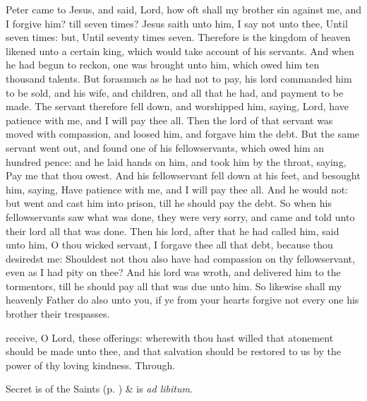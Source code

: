 
 Peter came to Jesus, and said, Lord, how oft shall my brother sin against me, and I forgive him? till seven times? Jesus saith unto him, I say not unto thee, Until seven times: but, Until seventy times seven. Therefore is the kingdom of heaven likened unto a certain king, which would take account of his servants. And when he had begun to reckon, one was brought unto him, which owed him ten thousand talents. But forasmuch as he had not to pay, his lord commanded him to be sold, and his wife, and children, and all that he had, and payment to be made. The servant therefore fell down, and worshipped him, saying, Lord, have patience with me, and I will pay thee all. Then the lord of that servant was moved with compassion, and loosed him, and forgave him the debt. But the same servant went out, and found one of his fellowservants, which owed him an hundred pence: and he laid hands on him, and took him by the throat, saying, Pay me that thou owest. And his fellowservant fell down at his feet, and besought him, saying, Have patience with me, and I will pay thee all. And he would not: but went and cast him into prison, till he should pay the debt. So when his fellowservants saw what was done, they were very sorry, and came and told unto their lord all that was done. Then his lord, after that he had called him, said unto him, O thou wicked servant, I forgave thee all that debt, because thou desiredst me: Shouldest not thou also have had compassion on thy fellowservant, even as I had pity on thee? And his lord was wroth, and delivered him to the tormentors, till he should pay all that was due unto him. So likewise shall my heavenly Father do also unto you, if ye from your hearts forgive not every one his brother their trespasses.


\secret
{} receive, O Lord, these offerings: wherewith thou hast willed that atonement should be made unto thee, and that salvation should be restored to us by the power of thy loving kindness. Through.
\begin{rubric}
     Secret is of the Saints (p. \pageref{SPSaints}) \&  is \emph{ad libitum}.
\end{rubric}

